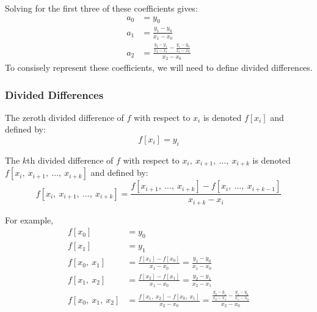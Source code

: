 \documentclass{article}
\begin{document}
Solving for the first three of these coefficients gives:
\begin{align*}
    a_0 & = y_0                                                                         \\
    a_1 & = \frac{y_1 - y_0}{x_1 - x_0}                                                 \\
    a_2 & = \frac{\frac{y_2 - y_1}{x_2 - x_1} - \frac{y_1 - y_0}{x_1 - x_0}}{x_2 - x_0}
\end{align*}
To consisely represent these coefficients, we will need to define divided differences.
\subsubsection{Divided Differences}
\begin{definition}
    The zeroth divided difference of \(f\) with respect to \(x_i\) is denoted \(f\left[ x_i \right]\) and defined by:
    \begin{equation*}
        f\left[ x_i \right] = y_i
    \end{equation*}
\end{definition}
\begin{definition}
    The \(k\)th divided difference of \(f\) with respect to \linebreak \(x_i,\: x_{i + 1},\: \dots,\: x_{i + k}\)
    is denoted \(f\left[ x_i,\: x_{i + 1},\: \dots,\: x_{i + k} \right]\) and defined by:
    \begin{equation*}
        f\left[ x_i,\: x_{i + 1},\: \dots,\: x_{i + k} \right] = \frac{f\left[ x_{i + 1},\: \dots,\: x_{i + k} \right] - f\left[ x_i,\: \dots,\: x_{i + k - 1} \right]}{x_{i + k} - x_i}
    \end{equation*}
\end{definition}
For example,
\begin{align*}
    f\left[ x_0 \right]               & = y_0                                                                                                                                                     \\
    f\left[ x_1 \right]               & = y_1                                                                                                                                                     \\
    f\left[ x_0,\: x_1 \right]        & = \frac{f\left[ x_1 \right] - f\left[ x_0 \right]}{x_1 - x_0} = \frac{y_1 - y_0}{x_1 - x_0}                                                               \\
    f\left[ x_1,\: x_2 \right]        & = \frac{f\left[ x_2 \right] - f\left[ x_1 \right]}{x_1 - x_0} = \frac{y_2 - y_1}{x_2 - x_1}                                                               \\
    f\left[ x_0,\: x_1,\: x_2 \right] & = \frac{f\left[ x_1,\: x_2 \right] - f\left[ x_0,\: x_1 \right]}{x_2 - x_0} = \frac{\frac{y_2 - y_1}{x_2 - x_1} - \frac{y_1 - y_0}{x_1 - x_0}}{x_2 - x_0}
\end{align*}
\end{document}
